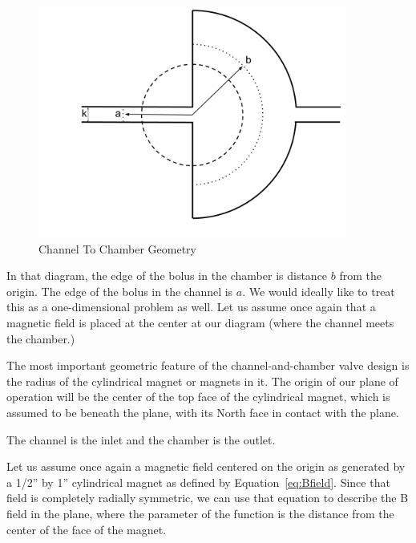 \documentclass[]{asme2ej}
\begin{document}
\begin{figure}
\centerline{\includegraphics[width=4in]{figure/ChannelToChamber.png}}
\caption{Channel To Chamber Geometry}
\label{fig:ChannelToChamber}
\end{figure}

In that diagram, the edge of the bolus in the chamber is distance $b$ from the
origin. The edge of the bolus in the channel is $a$.
We would ideally like to treat this as a one-dimensional problem as well.
Let us assume once again that a magnetic field is placed at the center
at our diagram (where the channel meets the chamber.)

The most important geometric feature of the channel-and-chamber
valve design is the radius of the cylindrical magnet or magnets
in it. The origin of our plane of operation
will be the center of the top face of the cylindrical magnet,
which is assumed to be beneath the plane, with its North face
in contact with the plane.

The channel is the inlet and the chamber is the
outlet.

Let us assume once again a magnetic field centered on the origin as generated by a
1/2'' by 1'' cylindrical magnet as defined by Equation~\ref{eq:Bfield}.
Since that field is completely radially symmetric, we can use that equation to
describe the B field in the plane, where the parameter of the function
is the distance from the center of the face of the magnet.
\end{document}
